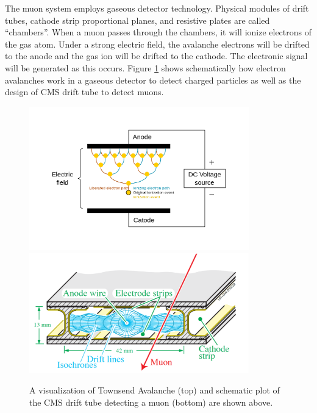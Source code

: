
The muon system employs gaseous detector technology. Physical modules of drift tubes, cathode strip proportional planes, and resistive plates are called ``chambers''. When a muon passes through the chambers, it will ionize electrons of the gas atom. Under a strong electric field, the avalanche electrons will be drifted to the anode and the gas ion will be drifted to the cathode. The electronic signal will be generated as this occurs. Figure \ref{Muonsystem} shows schematically how electron avalanches work in a gaseous detector to detect charged particles as well as the design of CMS drift tube to detect muons.


\begin{figure}[hbtp]
\begin{center}
\includegraphics[width=0.85\textwidth]{Figures/Chapter3/EAva.png}
\includegraphics[width=0.85\textwidth]{Figures/Chapter3/CMSDT.png}
\caption{A visualization of Townsend Avalanche (top) and schematic plot of the CMS drift tube detecting a muon (bottom) are shown above.}
\label{Muonsystem}
\end{center}
\end{figure} 


